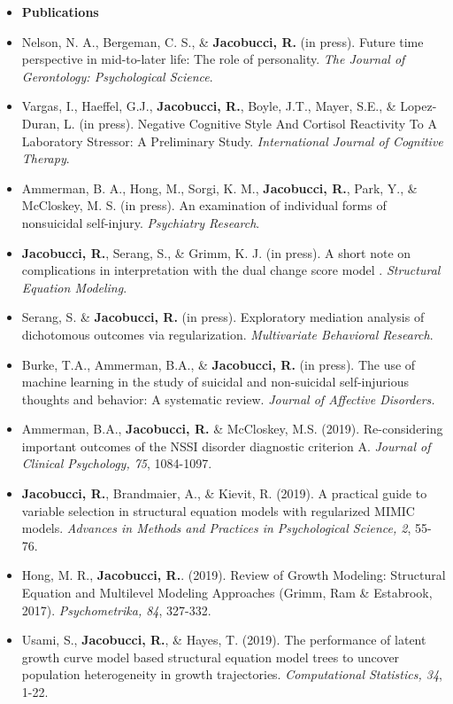 \documentclass[letterpaper,10pt]{article}
\begin{document}
\begin{itemize}
\item {\textbf{\large{Publications}}}
%
\item[] Nelson, N. A., Bergeman, C. S., \& \textbf{Jacobucci, R.} (in press). Future time perspective in mid-to-later life: The role of personality. \emph{The Journal of Gerontology: Psychological Science}.
% 
\item[] Vargas, I., Haeffel, G.J., \textbf{Jacobucci, R.}, Boyle, J.T., Mayer, S.E., \& Lopez-Duran, L. (in press). Negative Cognitive Style And Cortisol Reactivity To A Laboratory Stressor: A Preliminary Study. \emph{International Journal of Cognitive Therapy}. 
%
\item[] Ammerman, B. A., Hong, M., Sorgi, K. M., \textbf{Jacobucci, R.}, Park, Y., \& McCloskey, M. S. (in press). An examination of individual forms of nonsuicidal self-injury. \emph{Psychiatry Research}.
%
\item[] \textbf{Jacobucci, R.}, Serang, S., \& Grimm, K. J. (in press). A short note on complications in interpretation with the dual change score model . \emph{Structural Equation Modeling}.
% 
\item[]Serang, S. \& \textbf{Jacobucci, R.} (in press). Exploratory mediation analysis of dichotomous outcomes via regularization. \emph{Multivariate Behavioral Research}.
%
\item[] Burke, T.A., Ammerman, B.A., \& \textbf{Jacobucci, R.} (in press). The use of machine learning in the study of suicidal and non-suicidal self-injurious thoughts and behavior: A systematic review. \emph{Journal of Affective Disorders.}
%
\item[] Ammerman, B.A., \textbf{Jacobucci, R.} \& McCloskey, M.S. (2019). Re-considering important outcomes of the NSSI disorder diagnostic criterion A. \emph{Journal of Clinical Psychology, 75}, 1084-1097.
% 
\item[] \textbf{Jacobucci, R.}, Brandmaier, A., \& Kievit, R. (2019). A practical guide to variable selection in structural equation models with regularized MIMIC models. \emph{Advances in Methods and Practices in Psychological Science, 2}, 55-76.  
% 
\item[]Hong, M. R., \textbf{Jacobucci, R.}. (2019). Review of Growth Modeling: Structural Equation and Multilevel Modeling Approaches (Grimm, Ram \& Estabrook, 2017). \emph{Psychometrika, 84}, 327-332.
%
\item[] Usami, S., \textbf{Jacobucci, R.}, \& Hayes, T. (2019). The performance of latent growth curve model based structural equation model trees to uncover population heterogeneity in growth trajectories. \emph{Computational Statistics, 34}, 1-22.

\end{itemize}
\end{document}
